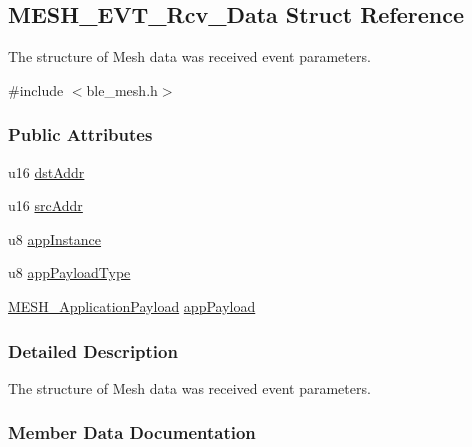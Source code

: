 \hypertarget{struct_m_e_s_h___e_v_t___rcv___data}{}\subsection{M\+E\+S\+H\+\_\+\+E\+V\+T\+\_\+\+Rcv\+\_\+\+Data Struct Reference}
\label{struct_m_e_s_h___e_v_t___rcv___data}


The structure of Mesh data was received event parameters.  




{\ttfamily \#include $<$ble\+\_\+mesh.\+h$>$}

\subsubsection*{Public Attributes}
\begin{DoxyCompactItemize}
\item 
u16 \hyperlink{struct_m_e_s_h___e_v_t___rcv___data_af4c46a837acb23b09e4b74269159df28}{dst\+Addr}
\item 
u16 \hyperlink{struct_m_e_s_h___e_v_t___rcv___data_a6acc0e85a53e7fe26c6f287004b2de38}{src\+Addr}
\item 
u8 \hyperlink{struct_m_e_s_h___e_v_t___rcv___data_a55810b74a72bfe37ca1747748d305503}{app\+Instance}
\item 
u8 \hyperlink{struct_m_e_s_h___e_v_t___rcv___data_a0e00cc071dac995d4083215e8972c3f5}{app\+Payload\+Type}
\item 
\hyperlink{union_m_e_s_h___application_payload}{M\+E\+S\+H\+\_\+\+Application\+Payload} \hyperlink{struct_m_e_s_h___e_v_t___rcv___data_a95666bc346b28c3444ec79868688757f}{app\+Payload}
\end{DoxyCompactItemize}


\subsubsection{Detailed Description}
The structure of Mesh data was received event parameters. 

\subsubsection{Member Data Documentation}
